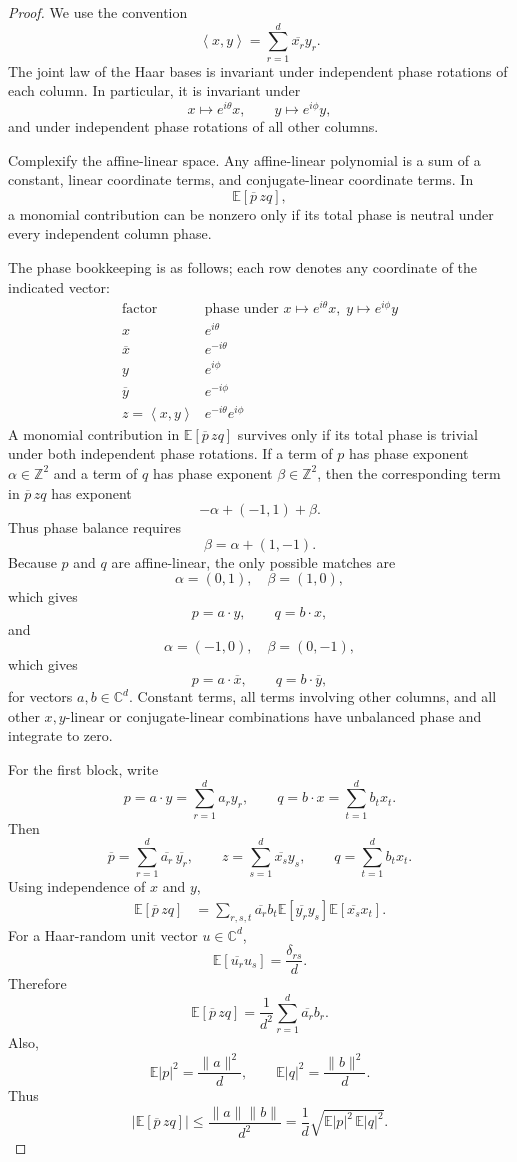 \documentclass[10pt,a4paper]{amsart}
\newcommand{\C}{\mathbb{C}}
\newcommand{\E}{\mathbb{E}}
\newcommand{\ip}[2]{\left\langle #1,#2\right\rangle}
\begin{document}
\begin{proof}
We use the convention
\[
\ip{x}{y}=\sum_{r=1}^d \overline{x_r}y_r.
\]
The joint law of the Haar bases is invariant under independent phase rotations of each column. In particular, it is invariant under
\[
x\mapsto e^{i\theta}x,
\qquad
 y\mapsto e^{i\phi}y,
\]
and under independent phase rotations of all other columns.

Complexify the affine-linear space. Any affine-linear polynomial is a sum of a constant, linear coordinate terms, and conjugate-linear coordinate terms. In
\[
\E[\overline p\,zq],
\]
a monomial contribution can be nonzero only if its total phase is neutral under every independent column phase.

The phase bookkeeping is as follows; each row denotes any coordinate of the indicated vector:
\[
\begin{array}{c|c}
\text{factor} & \text{phase under } x\mapsto e^{i\theta}x,\; y\mapsto e^{i\phi}y \\
\hline
x & e^{i\theta}\\
\overline{x} & e^{-i\theta}\\
y & e^{i\phi}\\
\overline{y} & e^{-i\phi}\\
z=\ip{x}{y} & e^{-i\theta}e^{i\phi}
\end{array}
\]
A monomial contribution in $\E[\overline p\,zq]$ survives only if its total phase is trivial under both independent phase rotations. If a term of $p$ has phase exponent $\alpha\in\mathbb Z^2$ and a term of $q$ has phase exponent $\beta\in\mathbb Z^2$, then the corresponding term in $\overline p\,zq$ has exponent
\[
-\alpha+(-1,1)+\beta.
\]
Thus phase balance requires
\[
\beta=\alpha+(1,-1).
\]
Because $p$ and $q$ are affine-linear, the only possible matches are
\[
\alpha=(0,1),\quad \beta=(1,0),
\]
which gives
\[
p=a\cdot y,
\qquad
q=b\cdot x,
\]
and
\[
\alpha=(-1,0),\quad \beta=(0,-1),
\]
which gives
\[
p=a\cdot \overline x,
\qquad
q=b\cdot \overline y,
\]
for vectors $a,b\in\C^d$. Constant terms, all terms involving other columns, and all other $x,y$-linear or conjugate-linear combinations have unbalanced phase and integrate to zero.

For the first block, write
\[
p=a\cdot y=\sum_{r=1}^d a_r y_r,
\qquad
q=b\cdot x=\sum_{t=1}^d b_t x_t.
\]
Then
\[
\overline p=\sum_{r=1}^d \overline{a_r}\,\overline{y_r},
\qquad
z=\sum_{s=1}^d \overline{x_s}y_s,
\qquad
q=\sum_{t=1}^d b_t x_t.
\]
Using independence of $x$ and $y$,
\[
\begin{aligned}
\E[\overline p\,zq]
&=
\sum_{r,s,t}
\overline{a_r}b_t
\E[\overline{y_r}y_s]
\E[\overline{x_s}x_t].
\end{aligned}
\]
For a Haar-random unit vector $u\in\C^d$,
\[
\E[\overline{u_r}u_s]=\frac{\delta_{rs}}d.
\]
Therefore
\[
\E[\overline p\,zq]
=
\frac1{d^2}\sum_{r=1}^d \overline{a_r}b_r.
\]
Also,
\[
\E|p|^2=\frac{\|a\|^2}{d},
\qquad
\E|q|^2=\frac{\|b\|^2}{d}.
\]
Thus
\[
\left|\E[\overline p\,zq]\right|
\le
\frac{\|a\|\|b\|}{d^2}
=
\frac1d\sqrt{\E|p|^2\,\E|q|^2}.
\]


\end{proof}
\end{document}

